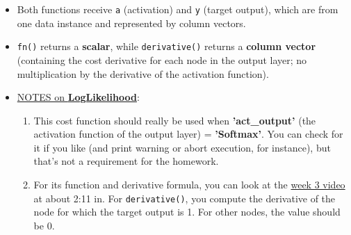 \documentclass[11pt]{article}
\begin{document}
\begin{itemize}
\item Both functions receive \texttt{a} (activation) and \texttt{y} (target output), which are from one data instance and represented by column vectors.
\item \texttt{fn()} returns a \textbf{scalar}, while \texttt{derivative()} returns a \textbf{column vector} (containing the cost derivative for each node in the output layer; no multiplication by the derivative of the activation function).

\item \uline{NOTES on \textbf{LogLikelihood}}:
\begin{enumerate}
\item This cost function should really be used when \textbf{'act\_output'} (the activation function of the output layer) = \textbf{'Softmax'}.  You can check for it if you like (and print warning or abort execution, for instance), but that's not a requirement for the homework.
\item For its function and derivative formula, you can look at the \href{https://depaul.zoom.us/rec/play/-9zBvchXodIQ6F1wN-eVXaAyOZpdjHMcA\_4BT6tPrXkkqEQb9frddpOd8p0FfTy7Zl5l4Zj8foa3Gp2O.cwaBIuqKYIq9Kojv?continueMode=true\&\_x\_zm\_rtaid=0hXVYogNTWeL\_9zcHvWxRA.1603064569512.dec1409ec0c39f5fdf363070d27a6cee\&\_x\_zm\_rhtaid=174}{week 3 video} at about 2:11 in.  For \texttt{derivative()}, you compute the derivative of the node for which the target output is 1.  For other nodes, the value should be 0.
\end{enumerate}
\end{itemize}
\end{document}
